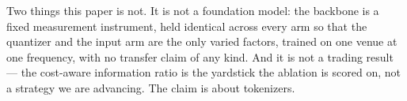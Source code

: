 Two things this paper is not. It is not a foundation model: the backbone is a fixed measurement
instrument, held identical across every arm so that the quantizer and the input arm are the only
varied factors, trained on one venue at one frequency, with no transfer claim of any kind. And it
is not a trading result --- the cost-aware information ratio is the yardstick the ablation is
scored on, not a strategy we are advancing. The claim is about tokenizers.
